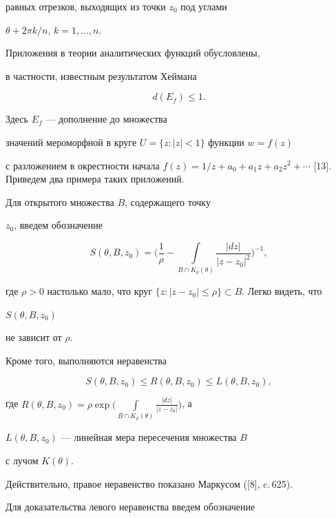 равных отрезков, выходящих из точки $z_0$ под углами 


$\theta+2\pi k/n$, $k=1,\dotsc,n$.





Приложения в теории аналитических функций обусловлены,


в частности, известным результатом Хеймана


\begin{equation}


d(E_f)\leq 1.


\end{equation}


Здесь $E_f$ --- дополнение до множества


значений мероморфной в круге $U=\{ z:|z|<1\} $ функции $w=f(z)$


с разложением в окрестности начала $f(z)=1/z+a_0+a_1z+


a_2z^2+\dotsb$ [13]. Приведем два примера таких приложений.


Для открытого множества $B$, содержащего точку


$z_0$, введем обозначение


$$


S(\theta , B, z_0)=\bigg(\frac{1}{\rho}-\int\limits_{B\cap K_\rho(\theta)}


\frac{|dz|}{|z-z_0|^2}\bigg)^{-1},


$$


где $\rho>0$ настолько мало, что круг $\{ z: |z-z_0|\leq


\rho\}\subset B$. Легко видеть, что 


$S(\theta, B, z_0)$


не зависит от $\rho$.


Кроме того, выполняются неравенства


$$


S(\theta,B,z_0)\leq R(\theta,B,z_0)\leq L(\theta,B,z_0),


$$


где $R(\theta, B, z_0)=\rho\exp\Big(\int\limits_{B\cap K_\rho (\theta)}


\frac{|dz|}{|z-z_0|}\Big)$, а


$L(\theta,B,z_0)$ --- линейная мера пересечения множества $B$


с лучом $K(\theta)$.


Действительно, правое неравенство показано Маркусом ([8], c.\,625).


Для доказательства левого неравенства введем обозначение


